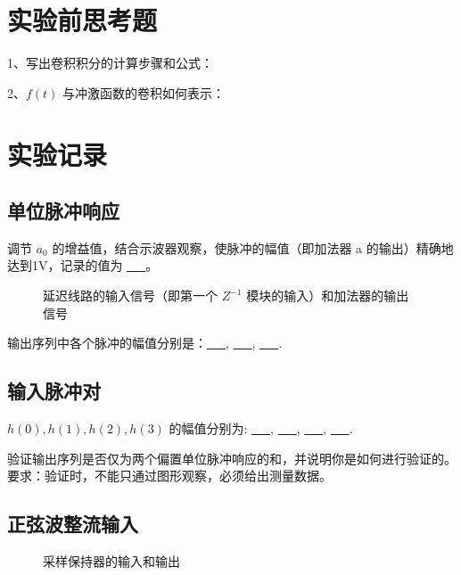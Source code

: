 \documentclass{sasreport}
\begin{document}
\maketitle

\section{实验前思考题}
1、写出卷积积分的计算步骤和公式：

2、$f(t)$ 与冲激函数的卷积如何表示：

\section{实验记录}
\subsection{单位脉冲响应}
调节 $a_0$ 的增益值，结合示波器观察，使脉冲的幅值（即加法器 a 的输出）精确地达到1V，记录的值为 \underline{\ \ \ }。

\begin{figure}[H]
    \caption{延迟线路的输入信号（即第一个 $Z^{-1}$ 模块的输入）和加法器的输出信号}
    \centering

\end{figure}
\noindent 输出序列中各个脉冲的幅值分别是：\underline{\ \ \ }, \underline{\ \ \ }, \underline{\ \ \ }.

\subsection{输入脉冲对}
$h(0),h(1),h(2),h(3)$ 的幅值分别为: \underline{\ \ \ }, \underline{\ \ \ }, \underline{\ \ \ }, \underline{\ \ \ }.

验证输出序列是否仅为两个偏置单位脉冲响应的和，并说明你是如何进行验证的。要求：验证时，不能只通过图形观察，必须给出测量数据。

\subsection{正弦波整流输入}
\begin{figure}[H]
    \caption{采样保持器的输入和输出}
    \centering

\end{figure}
\end{document}
